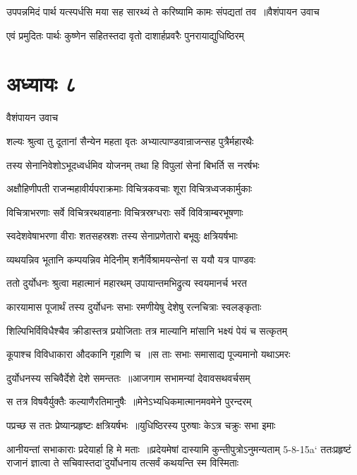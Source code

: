 \threelineshloka
{उपपन्नमिदं पार्थ यत्स्पर्धसि मया सह}
{सारथ्यं ते करिष्यामि कामः संपद्यतां तव ॥वैशंपायन उवाच}
{}


\twolineshloka
{एवं प्रमुदितः पार्थः कुष्णेन सहितस्तदा}
{वृतो दाशार्हप्रवरैः पुनरायाद्युधिष्ठिरम्}


\chapter{अध्यायः ८}
\twolineshloka
{वैशंपायन उवाच}
{}


\twolineshloka
{शल्यः श्रुत्वा तु दूतानां सैन्येन महता वृतः}
{अभ्यात्पाण्डवान्राजन्सह पुत्रैर्महारथैः}


\twolineshloka
{तस्य सेनानिवेशोऽभूदध्वर्धमिव योजनम्}
{तथा हि विपुलां सेनां बिभर्ति स नरर्षभः}


\twolineshloka
{अक्षौहिणीपती राजन्महावीर्यपराक्रमाः}
{विचित्रकवचाः शूरा विचित्रध्वजकार्मुकाः}


\twolineshloka
{विचित्राभरणाः सर्वे विचित्ररथवाहनाः}
{विचित्रस्रग्धराः सर्वे विवित्राम्बरभूषणाः}


\twolineshloka
{स्वदेशवेषाभरणा वीराः शतसहस्रशः}
{तस्य सेनाप्रणेतारो बभूवुः क्षत्रियर्षभाः}


\twolineshloka
{व्यथयन्निव भूतानि कम्पयन्निव मेदिनीम्}
{शनैर्विश्रामयन्सेनां स ययौ यत्र पाण्डवः}


\twolineshloka
{ततो दुर्योधनः श्रुत्वा महात्मानं महारथम्}
{उपायान्तमभिद्रुत्य स्वयमानर्च भरत}


\twolineshloka
{कारयामास पूजार्थं तस्य दुर्योधनः सभाः}
{रमणीयेषु देशेषु रत्नचित्राः स्वलङ्कृताः}


\twolineshloka
{शिल्पिभिर्विविधैश्चैव क्रीडास्तत्र प्रयोजिताः}
{तत्र माल्यानि मांसानि भक्ष्यं पेयं च सत्कृतम्}


\twolineshloka
{कूपाश्च विविधाकारा औदकानि गृहाणि च ॥स ताः सभाः समासाद्य पूज्यमानो यथाऽमरः}
{}


\twolineshloka
{दुर्योधनस्य सचिवैर्देशे देशे समन्ततः ॥आजगाम सभामन्यां देवावसथवर्चसम्}
{}


\twolineshloka
{स तत्र विषयैर्युक्तैः कल्याणैरतिमानुषैः ॥मेनेऽभ्यधिकमात्मानमवमेने पुरन्दरम्}
{}


\twolineshloka
{पप्रच्छ स ततः प्रेष्यान्प्रहृष्टः क्षत्रियर्षभः ॥युधिष्ठिरस्य पुरुषाः केऽत्र चक्रुः सभा इमाः}
{}


\twolineshloka
{आनीयन्तां सभाकाराः प्रदेयार्हा हि मे मताः ॥प्रदेयमेषां दास्यामि कुन्तीपुत्रोऽनुमन्यताम्}
{5-8-15a` ततःप्रहृष्टं राजानं ज्ञात्वा ते सचिवास्तदा'दुर्योधनाय तत्सर्वं कथयन्ति स्म विस्मिताः}


